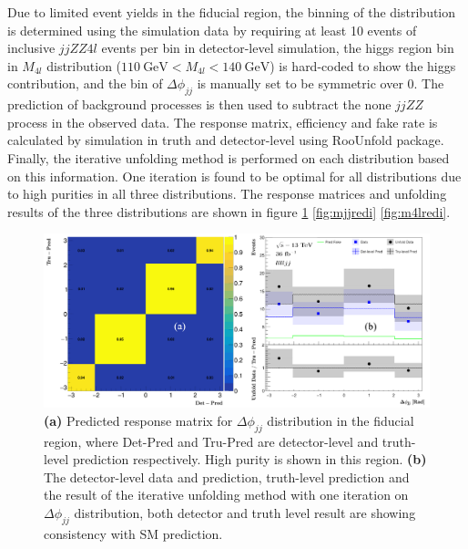 \documentclass[12pt]{article}
\begin{document}
            \par Due to limited event yields in the fiducial region, the binning of the distribution is determined using the simulation 
            data by requiring at least 10 events of inclusive $jjZZ4l$ events per bin in detector-level simulation, the higgs region 
            bin in $M_{4l}$ distribution ($110\ \text{GeV} < M_{4l}< 140\ \text{GeV}$) is hard-coded to show the higgs contribution, 
            and the bin of $\Delta{\phi}_{jj}$ is manually set to be symmetric over 0. The prediction of background processes is then 
            used to subtract the none $jjZZ$ process in the observed data. The response matrix, efficiency and fake rate is calculated 
            by simulation in truth and detector-level using RooUnfold package\cite{adye2011unfolding}. Finally, the iterative unfolding 
            method is performed on each distribution based on this information. One iteration is found to be optimal for all distributions 
            due to high purities in all three distributions. The response matrices and unfolding results of the three distributions are 
            shown in figure \ref{fig:delredi} \ref{fig:mjjredi} \ref{fig:m4lredi}.            
            \begin{figure}[ht]
                \begin{centering}
                \includegraphics[scale=0.108]{ps/del_redi.png}
                \caption{\textbf{(a)} Predicted response matrix for $\Delta\phi_{jj}$ distribution in the fiducial region, where Det-Pred and Tru-Pred are detector-level and truth-level prediction respectively.
                High purity is shown in this region. \textbf{(b)} The detector-level data and prediction, truth-level prediction and the result of the iterative unfolding method with one iteration on $\Delta\phi_{jj}$ distribution, both detector and truth level result are showing consistency with SM prediction.}
                \label{fig:delredi}
                \end{centering}
            \end{figure}
\end{document}
